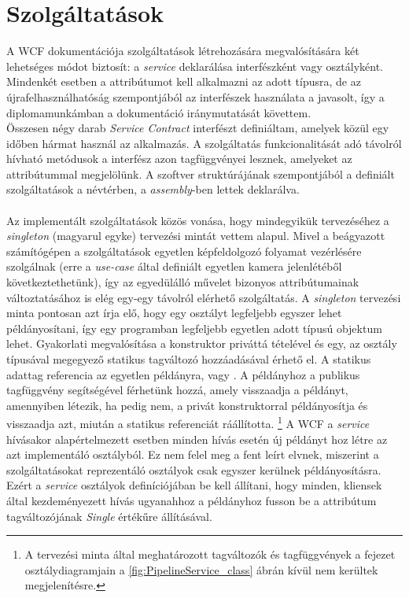 \section{Szolgáltatások} \label{section:servicek}
A WCF dokumentációja szolgáltatások létrehozására megvalósítására két lehetséges módot biztosít: a \emph{service} deklarálása interfészként vagy osztályként. Mindenkét esetben a \code{[ServiceContract]} attribútumot kell alkalmazni az adott típusra, de az újrafelhasználhatóság szempontjából az interfészek használata a javasolt, így a diplomamunkámban a dokumentáció iránymutatását követtem. \cite{wcf-doc} \\
Összesen négy darab \emph{Service Contract} interfészt definiáltam, amelyek közül egy időben hármat használ az alkalmazás. A szolgáltatás funkcionalitását adó távolról hívható metódusok a \code{[ServiceContract]} interfész azon tagfüggvényei lesznek, amelyeket az \code{[OperationContract]} attribútummal megjelölünk. A szoftver struktúrájának szempontjából a definiált szolgáltatások a  névtérben, a  \emph{assembly}-ben lettek deklarálva.\\
\\
Az implementált szolgáltatások közös vonása, hogy mindegyikük tervezéséhez a \emph{singleton} (magyarul egyke) tervezési mintát vettem alapul. Mivel a beágyazott számítógépen a szolgáltatások egyetlen képfeldolgozó folyamat vezérlésére szolgálnak (erre a \emph{use-case} által definiált egyetlen kamera jelenlétéből következtethetünk), így az egyedülálló művelet bizonyos attribútumainak változtatásához is elég egy-egy távolról elérhető szolgáltatás. A \emph{singleton} tervezési minta pontosan azt írja elő, hogy egy osztályt legfeljebb egyszer lehet példányosítani, így egy programban legfeljebb egyetlen adott típusú objektum lehet. Gyakorlati megvalósítása a konstruktor priváttá tételével és egy, az osztály típusával megegyező statikus tagváltozó hozzáadásával érhető el. A statikus adattag referencia az egyetlen példányra, vagy . A példányhoz a publikus  tagfüggvény segítségével férhetünk hozzá, amely visszaadja a példányt, amennyiben létezik, ha pedig nem, a privát konstruktorral példányosítja és visszaadja azt, miután a statikus referenciát ráállította. \footnote{A tervezési minta által meghatározott tagváltozók és tagfüggvények a fejezet osztálydiagramjain a \ref{fig:PipelineService_class} ábrán kívül nem kerültek megjelenítésre.} A WCF a \emph{service} hívásakor alapértelmezett esetben minden hívás esetén új példányt hoz létre az azt implementáló osztályból. Ez nem felel meg a fent leírt elvnek, miszerint a szolgáltatásokat reprezentáló osztályok csak egyszer kerülnek példányosításra. Ezért a \emph{service} osztályok definíciójában be kell állítani, hogy minden, kliensek által kezdeményezett hívás ugyanahhoz a példányhoz fusson be a \code{[ServiceBehavior]} attribútum  tagváltozójának \emph{Single} értékűre állításával.

